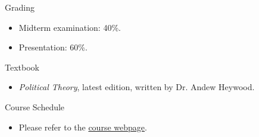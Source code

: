 \documentclass{article}
\begin{document}
\newpage
\begin{flushleft}
Grading \\
\end{flushleft}
\begin{itemize}
\item Midterm examination: 40\%. \\
\item Presentation: 60\%. \\
\end{itemize}
Textbook \\
\begin{itemize}
\item \textit{Political Theory}, latest edition, written by Dr. Andew Heywood. \\
\end{itemize}
Course Schedule \\
\begin{itemize}
\item Please refer to the \href{https://politics-tchsiao.github.io/political_theory/}{course webpage}. \\
\end{itemize}
\end{document}
